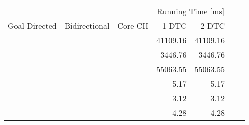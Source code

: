 \begin{tabular}{cccrrrr}
	\toprule
	              &               &         & \multicolumn{2}{c}{Running Time [\si{\milli\second}]}         \\
	Goal-Directed & Bidirectional & Core CH & 1-DTC                                                 & 2-DTC \\
	\midrule
	\xmark        & \xmark        & \xmark  & 41109.16                                                     & 41109.16     \\
	\cmark        & \xmark        & \xmark  & 3446.76                                                     & 3446.76     \\
	\xmark        & \cmark        & \xmark  & 55063.55                                                     & 55063.55     \\
	\cmark        & \cmark        & \xmark  & 5.17                                                     & 5.17     \\
	\xmark        & \cmark        & \cmark  & 3.12                                                     & 3.12     \\
	\cmark        & \cmark        & \cmark  & 4.28                                                     & 4.28     \\
	\bottomrule
\end{tabular}